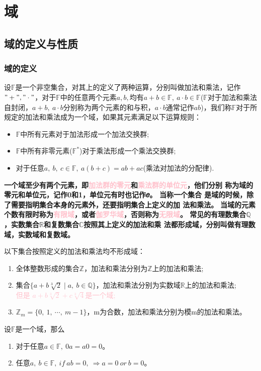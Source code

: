 \documentclass[cn,10pt]{elegantbook}
\begin{document}
\chapter{域}
\section{域的定义与性质}
\subsection{域的定义}
\begin{definition}
  设$\mathbb{F}$是一个非空集合，对其上的定义了两种运算，分别叫做加法和乘法，记作$"+"," \cdot "$，对于$\mathbb{F}$中的任意两个元素$a,b,$均有$a+b \in \mathbb{F},\ a \cdot b \in \mathbb{F}$($\mathbb{F}$对于加法和乘法自封闭，$a+b,\ a \cdot b$分别称为两个元素的和与积，$a \cdot b$通常记作$ab$)，我们称$\mathbb{F}$对于所规定的加法和乘法成为一个域，如果其元素满足以下运算规则：
  \begin{itemize}
    \item $\mathbb{F}$中所有元素对于加法形成一个加法交换群;
    \item $\mathbb{F}$中所有非零元素($\mathbb{F}^{*}$)对于乘法形成一个乘法交换群;
    \item 对于任意$a,\ b,\ c \in \mathbb{F},\ a(b+c) = ab + ac$(乘法对加法的分配律).
  \end{itemize}
\end{definition}
\vskip 0.5cm
\textbf{一个域至少有两个元素，即\textcolor{pink}{加法群的零元}和\textcolor{pink}{乘法群的单位元}，他们分别
称为域的零元和单位元，记作0和1，单位元有时也记作𝑒。 当称一个集合
是域的时候，除了需要指明集合本身的元素外，还要指明集合上定义的加
法和乘法。}
\vskip 0.5cm
\textbf{当域的元素个数有限时称为\textcolor{pink}{有限域}，或者\textcolor{pink}{伽罗华域}，否则称为\textcolor{pink}{无限域}。
常见的有理数集合$\mathbb{Q}$，实数集合$\mathbb{R}$和复数集合$\mathbb{C}$按照其上定义的加法和乘
法都形成域，分别叫做有理数域，实数域和复数域。
}
\vskip 0.5cm
\begin{example}
  以下集合按照定义的加法和乘法均不形成域：
  \begin{enumerate}[(1)]
    \item 全体整数形成的集合$\mathbb{Z}$，加法和乘法分别为$\mathbb{Z}$上的加法和乘法;
    \item 集合$\{a+b \sqrt[3]{2} \mid a,\ b \in \mathbb{Q}\}$，加法和乘法分别为实数域$\mathbb{R}$上的加法和乘法;
    \\ \textcolor{pink}{但是 $a+b \sqrt[3]{2} + c \sqrt[3]{4}$是一个域;}
    \item $\mathbb{Z}_{m} = \{0,\ 1,\ \cdots ,\ m-1 \}$，m为合数，加法和乘法分别为模m的加法和乘法。
  \end{enumerate}
\end{example}
\begin{theorem}
  设$\mathbb{F}$是一个域，那么
  \begin{enumerate}[(1)]
    \item 对于任意$a \in \mathbb{F},\ 0a = a0 = 0$。
    \item 任意$a,\ b \in \mathbb{F},\ if \ ab =0,\ \Rightarrow a = 0 \ or \ b = 0$。
  \end{enumerate}
\end{theorem}
\end{document}
